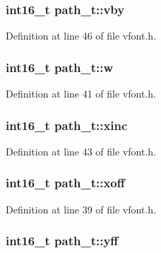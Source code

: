 \subsubsection[{\texorpdfstring{vby}{vby}}]{\setlength{\rightskip}{0pt plus 5cm}int16\+\_\+t path\+\_\+t\+::vby}\hypertarget{structpath__t_a3e3a916459dda0710dd252e541fbd372}{}\label{structpath__t_a3e3a916459dda0710dd252e541fbd372}


Definition at line 46 of file vfont.\+h.

\subsubsection[{\texorpdfstring{w}{w}}]{\setlength{\rightskip}{0pt plus 5cm}int16\+\_\+t path\+\_\+t\+::w}\hypertarget{structpath__t_a8977017efd250c8fd0eb168f44c618eb}{}\label{structpath__t_a8977017efd250c8fd0eb168f44c618eb}


Definition at line 41 of file vfont.\+h.

\subsubsection[{\texorpdfstring{xinc}{xinc}}]{\setlength{\rightskip}{0pt plus 5cm}int16\+\_\+t path\+\_\+t\+::xinc}\hypertarget{structpath__t_a88d6e591604a22ee9bd48f014fc6585c}{}\label{structpath__t_a88d6e591604a22ee9bd48f014fc6585c}


Definition at line 43 of file vfont.\+h.

\subsubsection[{\texorpdfstring{xoff}{xoff}}]{\setlength{\rightskip}{0pt plus 5cm}int16\+\_\+t path\+\_\+t\+::xoff}\hypertarget{structpath__t_afe950c04d6d3082639bd97b53f0f4b41}{}\label{structpath__t_afe950c04d6d3082639bd97b53f0f4b41}


Definition at line 39 of file vfont.\+h.

\subsubsection[{\texorpdfstring{yff}{yff}}]{\setlength{\rightskip}{0pt plus 5cm}int16\+\_\+t path\+\_\+t\+::yff}\hypertarget{structpath__t_a208b1e1aa60b621e3632cc28d0b4f14b}{}\label{structpath__t_a208b1e1aa60b621e3632cc28d0b4f14b}


